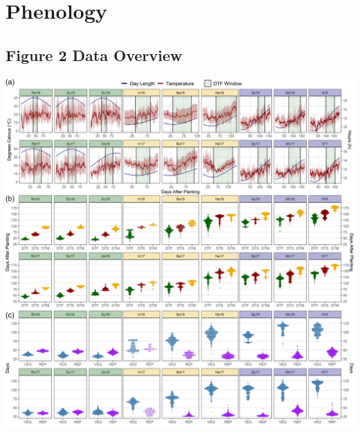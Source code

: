 \documentclass[
]{article}
\begin{document}
\hypertarget{phenology}{%
\section{Phenology}\label{phenology}}

\hypertarget{figure-2-data-overview}{%
\subsection{Figure 2 Data Overview}\label{figure-2-data-overview}}

\includegraphics{Figure_02.png}
\end{document}
